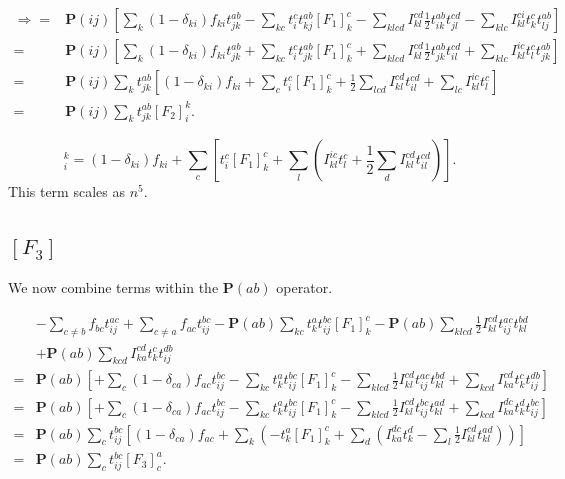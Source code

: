 \documentclass[a4paper,norsk,11pt,twoside]{report}
\begin{document}
\begin{align}
\Rightarrow = &
\textbf{P}(ij) \left[
\sum_{k} (1 - \delta_{ki}) f_{ki} t_{jk}^{ab}
- \sum_{kc} t_i^c t_{kj}^{ab} [F_1]_k^c
- \sum_{klcd}  I_{kl}^{cd} \frac{1}{2} t_{ik}^{ab} t_{jl}^{cd}
- \sum_{klc} I_{kl}^{ci} t_k^c t_{lj}^{ab}
\right]
\nonumber \\
= &
\textbf{P}(ij) \left[
\sum_{k} (1 - \delta_{ki}) f_{ki} t_{jk}^{ab}
+ \sum_{kc} t_i^c t_{jk}^{ab} [F_1]_k^c
+ \sum_{klcd}  I_{kl}^{cd} \frac{1}{2} t_{jk}^{ab} t_{il}^{cd}
+ \sum_{klc} I_{kl}^{ic} t_l^c t_{jk}^{ab}
\right]
\nonumber \\
= &
\textbf{P}(ij) \sum_k t_{jk}^{ab} \left[
(1 - \delta_{ki}) f_{ki}
+ \sum_c t_i^c [F_1]_k^c
+ \frac{1}{2} \sum_{lcd} I_{kl}^{cd} t_{il}^{cd}
+ \sum_{lc} I_{kl}^{ic} t_l^c
\right]
\nonumber \\
= &
\textbf{P}(ij) \sum_k t_{jk}^{ab} [F_2]_i^k .
\end{align}

\begin{equation}
[F_2]_i^k = (1 - \delta_{ki}) f_{ki}
+ \sum_c \left[t_i^c [F_1]_k^c
+ \sum_{l} \left( I_{kl}^{ic} t_l^c 
+ \frac{1}{2} \sum_{d} I_{kl}^{cd} t_{il}^{cd}
\right)
\right] .
\label{intermedF2}
\end{equation}
This term scales as $n^5$.

\subsection{$[F_3]$}
We now combine terms within the $\textbf{P}(ab)$ operator.

\begin{align}
& - \sum_{c \not= b} f_{bc} t_{ij}^{ac}
+ \sum_{c \not= a} f_{ac} t_{ij}^{bc}
- \textbf{P}(ab) \sum_{kc} t_k^a t_{ij}^{bc} [F_1]_k^c
- \textbf{P}(ab) \sum_{klcd} \frac{1}{2} I_{kl}^{cd} t_{ij}^{ac} t_{kl}^{bd}
\nonumber \\ &
+ \textbf{P}(ab) \sum_{kcd} I_{ka}^{cd} t_k^c t_{ij}^{db} \nonumber \\
= &
\textbf{P}(ab) \left[
+ \sum_c (1-\delta_{ca}) f_{ac} t_{ij}^{bc}
- \sum_{kc} t_k^a t_{ij}^{bc} [F_1]_k^c
- \sum_{klcd} \frac{1}{2} I_{kl}^{cd} t_{ij}^{ac} t_{kl}^{bd}
+ \sum_{kcd} I_{ka}^{cd} t_k^c t_{ij}^{db} 
\right]
\nonumber \\
= &
\textbf{P}(ab) \left[
+ \sum_c (1-\delta_{ca}) f_{ac} t_{ij}^{bc}
- \sum_{kc} t_k^a t_{ij}^{bc} [F_1]_k^c
- \sum_{klcd} \frac{1}{2} I_{kl}^{cd} t_{ij}^{bc} t_{kl}^{ad}
+ \sum_{kcd} I_{ka}^{dc} t_k^d t_{ij}^{bc} 
\right]
\nonumber \\
= &
\textbf{P}(ab) \sum_c t_{ij}^{bc}
\left[
(1-\delta_{ca}) f_{ac}
+ \sum_{k} \left( - t_k^a [F_1]_k^c
+ \sum_{d} \left( I_{ka}^{dc} t_k^d 
- \sum_{l} \frac{1}{2} I_{kl}^{cd} t_{kl}^{ad} \right) \right)
\right] \nonumber \\
= &
\textbf{P}(ab) \sum_c t_{ij}^{bc} [F_3]_c^a .
\end{align}
\end{document}
